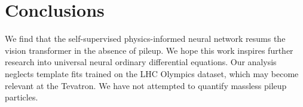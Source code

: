 \section{Conclusions}\label{sec:conclusions}

We find that the self-supervised physics-informed neural network resums
the vision transformer in the absence of pileup. We hope this work
inspires further research into universal neural ordinary differential
equations. Our analysis neglects template fits trained on the LHC
Olympics dataset, which may become relevant at the Tevatron. We have not
attempted to quantify massless pileup particles.

